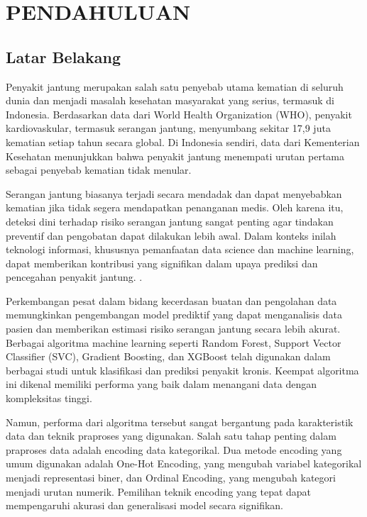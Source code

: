 \chapter{PENDAHULUAN}
\section{Latar Belakang}
\label{section:latarbelakang}
Penyakit jantung merupakan salah satu penyebab utama kematian di seluruh dunia dan menjadi masalah kesehatan masyarakat yang serius, termasuk di Indonesia. Berdasarkan data dari World Health Organization (WHO), penyakit kardiovaskular, termasuk serangan jantung, menyumbang sekitar 17,9 juta kematian setiap tahun secara global. Di Indonesia sendiri, data dari Kementerian Kesehatan menunjukkan bahwa penyakit jantung menempati urutan pertama sebagai penyebab kematian tidak menular.

Serangan jantung biasanya terjadi secara mendadak dan dapat menyebabkan kematian jika tidak segera mendapatkan penanganan medis. Oleh karena itu, deteksi dini terhadap risiko serangan jantung sangat penting agar tindakan preventif dan pengobatan dapat dilakukan lebih awal. Dalam konteks inilah teknologi informasi, khususnya pemanfaatan data science dan machine learning, dapat memberikan kontribusi yang signifikan dalam upaya prediksi dan pencegahan penyakit jantung. \cite{malasan_photometric_1986, malasan_remote_2006}.

Perkembangan pesat dalam bidang kecerdasan buatan dan pengolahan data memungkinkan pengembangan model prediktif yang dapat menganalisis data pasien dan memberikan estimasi risiko serangan jantung secara lebih akurat. Berbagai algoritma machine learning seperti Random Forest, Support Vector Classifier (SVC), Gradient Boosting, dan XGBoost telah digunakan dalam berbagai studi untuk klasifikasi dan prediksi penyakit kronis. Keempat algoritma ini dikenal memiliki performa yang baik dalam menangani data dengan kompleksitas tinggi.

Namun, performa dari algoritma tersebut sangat bergantung pada karakteristik data dan teknik praproses yang digunakan. Salah satu tahap penting dalam praproses data adalah encoding data kategorikal. Dua metode encoding yang umum digunakan adalah One-Hot Encoding, yang mengubah variabel kategorikal menjadi representasi biner, dan Ordinal Encoding, yang mengubah kategori menjadi urutan numerik. Pemilihan teknik encoding yang tepat dapat mempengaruhi akurasi dan generalisasi model secara signifikan.

